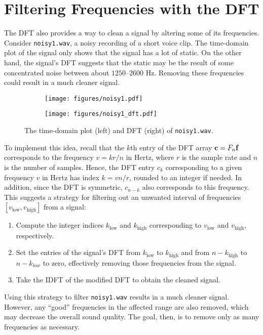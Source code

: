 \section*{Filtering Frequencies with the DFT} %

The DFT also provides a way to clean a signal by altering some of its frequencies.
Consider \texttt{noisy1.wav}, a noisy recording of a short voice clip.
The time-domain plot of the signal only shows that the signal has a lot of static.
On the other hand, the signal's DFT suggests that the static may be the result of some concentrated noise between about $1250$--$2600$ Hz.
Removing these frequencies could result in a much cleaner signal.

\begin{figure}[H]
\captionsetup[subfigure]{justification=centering}
\centering
\begin{subfigure}{.53\textwidth}
    \centering
    \texttt{[image: figures/noisy1.pdf]}
\end{subfigure}%
\begin{subfigure}{.47\textwidth}
    \centering
    \texttt{[image: figures/noisy1\_dft.pdf]}
\end{subfigure}
\caption{The time-domain plot (left) and DFT (right) of \texttt{noisy1.wav}.}
\label{fig:fft-noisy-signal}
\end{figure}

To implement this idea, recall that the $k$th entry of the DFT array $\mathbf{c} = F_n \mathbf{f}$ corresponds to the frequency $v = k r / n$ in Hertz, where $r$ is the sample rate and $n$ is the number of samples.
Hence, the DFT entry $c_k$ corresponding to a given frequency $v$ in Hertz has index $k = v n / r$, rounded to an integer if needed.
In addition, since the DFT is symmetric, $c_{n-k}$ also corresponds to this frequency. %
This suggests a strategy for filtering out an unwanted interval of frequencies $[v_\text{low},v_\text{high}]$ from a signal:
\begin{enumerate}
\item Compute the integer indices $k_\text{low}$ and $k_\text{high}$ corresponding to $v_\text{low}$ and $v_\text{high}$, respectively.
\item Set the entries of the signal's DFT from $k_\text{low}$ to $k_\text{high}$ and from $n-k_\text{high}$ to $n-k_{low}$ to zero, effectively removing those frequencies from the signal.
\item Take the IDFT of the modified DFT to obtain the cleaned signal.
\end{enumerate}
Using this strategy to filter \texttt{noisy1.wav} results in a much cleaner signal. %
However, any ``good'' frequencies in the affected range are also removed, which may decrease the overall sound quality.
The goal, then, is to remove only as many frequencies as necessary.

